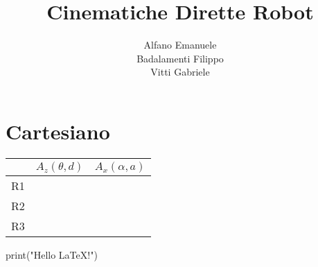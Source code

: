\documentclass[a4paper,11pt]{article}
\author{Alfano Emanuele \\ Badalamenti Filippo \\ Vitti Gabriele}
\newcommand{\DHTable}{
	\begin{tabular}{c|c|c|c|c|}
		\cline{2-5} &
		\multicolumn{2}{|c|}{$A_z(\theta,d)$} &
		\multicolumn{2}{|c|}{$A_x(\alpha,a)$} \\
		\hline
		\multicolumn{1}{|c|}{R1} &  &  &  &  \\
		\hline
		\multicolumn{1}{|c|}{R2} &  &  &  &  \\
		\hline
		\multicolumn{1}{|c|}{R3} &  &  &  &  \\
		\hline
	\end{tabular}
}
\begin{document}
\title{Cinematiche Dirette Robot}
\maketitle
\pagebreak

\section*{Cartesiano}
\DHTable


\begin{python}
	
	print("Hello \LaTeX!")
	
\end{python}
\end{document}
